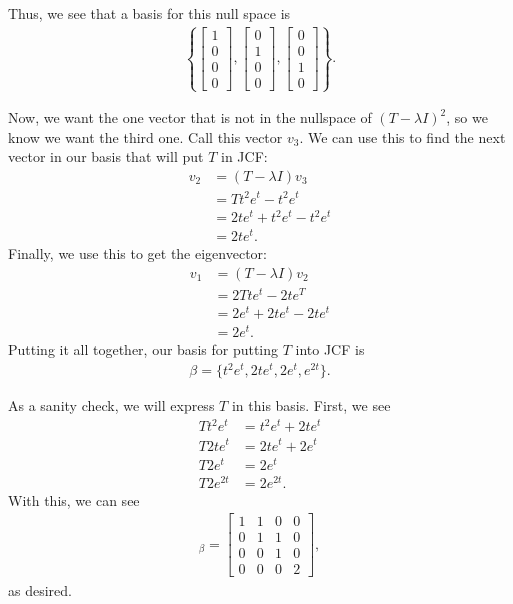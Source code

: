 \documentclass[10pt,a4paper]{article}
\theoremstyle{definition}
\begin{document}
Thus, we see that a basis for this null space is
\begin{align*}
\left\{\begin{bmatrix}
1\\
0\\
0\\
0
\end{bmatrix}, \begin{bmatrix}
0\\
1\\
0\\
0
\end{bmatrix},
\begin{bmatrix}
0\\
0\\
1\\
0
\end{bmatrix}\right\}.
\end{align*}

Now, we want the one vector that is not in the nullspace of $(T - \lambda I)^2$, so we know we want the third one. Call this vector $v_3$. We can use this to find the next vector in our basis that will put $T$ in JCF:
\begin{align*}
v_2 &= (T - \lambda I)v_3\\
&= Tt^2e^t - t^2e^t\\
&= 2te^t + t^2e^t - t^2 e^t\\
&= 2te^t.
\end{align*}
Finally, we use this to get the eigenvector:
\begin{align*}
v_1 &= (T - \lambda I)v_2\\
&= 2Tte^t - 2te^T\\
&= 2e^t + 2te^t - 2te^t\\
&= 2e^t.
\end{align*}
Putting it all together, our basis for putting $T$ into JCF is 
\begin{align*}
\beta = \{t^2e^t, 2te^t, 2e^t, e^{2t}\}.
\end{align*}

As a sanity check, we will express $T$ in this basis. First, we see
\begin{align*}
Tt^2 e^t &= t^2e^t + 2te^t\\
T2te^t &= 2te^t + 2e^t\\
T2e^t &= 2e^t\\
T2e^{2t} &= 2e^{2t}.
\end{align*}
With this, we can see
\begin{align*}
[T]_\beta = \begin{bmatrix}
1 &1 &0 &0\\
0 &1 &1 &0\\
0 &0 &1 &0\\
0 &0 &0 &2
\end{bmatrix},
\end{align*}
as desired.
\end{document}

